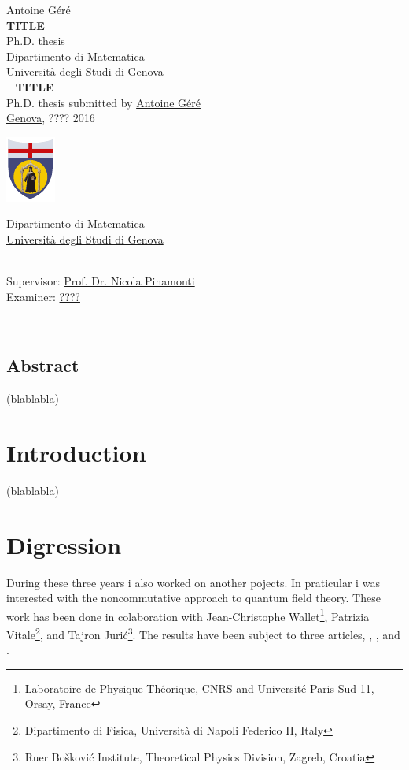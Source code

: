 \documentclass[11pt]{book}
\makeatletter
\newcommand*{\makepagetitle}{%
%
{\raggedright%
%
%
%
%
\thispagestyle{empty}%
%
\vspace*{50pt}
%
{\Large Antoine Géré}\\%
%
\vspace*{120pt}%
%
{\Huge\bfseries TITLE}\\[\baselineskip]%
%
\vspace*{60pt}%
%
{\Large Ph.D. thesis}\\[\baselineskip]%
%
\vspace*{80pt}%
%
{\Large Dipartimento di Matematica}\\[\baselineskip]%
%
\vspace*{1pt}
%
{\Large Università degli Studi di Genova}\\[\baselineskip]%
%
\vfill%
%
%
\newpage%
%
\thispagestyle{empty}%
%
\ \vfill%
%
%
\textbf{TITLE} \\[2pt] %
Ph.D. thesis submitted by \href{mailto:gere@dima.unige.it}{Antoine Géré} \\[1pt]
\href{http://www.comune.genova.it/}{Genova}, ???? 2016 \\[10pt]
%
%
\begin{minipage}{0.1\linewidth}
\includegraphics[scale=1]{unige.pdf}
\end{minipage}
%
\begin{minipage}{0.85\linewidth}
\href{http://www.dima.unige.it/}{Dipartimento di Matematica} \\[1pt]
\href{http://www.unige.it/}{Università degli Studi di Genova}
\end{minipage}
%
%
\vspace*{10pt} \\
Supervisor: \href{mailto:pinamont@dima.unige.it}{Prof. Dr. Nicola Pinamonti} \\[1pt]
%
Examiner: \href{mailto:????@????.com}{????}
%
%
%
%
}%
%
}%
\theoremstyle{break}
\makeatother
\begin{document}




\makepagetitle




\newpage


\ \vfill




\vfill


\newpage
\vspace*{100pt}
\section*{Abstract}


(blablabla)




\tableofcontents


\chapter*{Introduction}


(blablabla)

\chapter*{Digression}


During these three years i also worked on another pojects. In praticular i was interested with the noncommutative approach to quantum field theory. These work has been done in colaboration with Jean-Christophe Wallet\footnote{Laboratoire de Physique Th\'eorique, CNRS and Universit\'e Paris-Sud 11, Orsay, France}, Patrizia Vitale\footnote{Dipartimento di Fisica, Universit\`a di Napoli Federico II, Italy}, and Tajron Juri\'c\footnote{Ru\dj er Bo\v{s}kovi\'c Institute, Theoretical Physics Division, Zagreb, Croatia}. The results have been subject to three articles, \cite{gere_spectral_2014}, \cite{gere_noncommutative_2015}, and \cite{gere_quantum_2014}.
\end{document}
